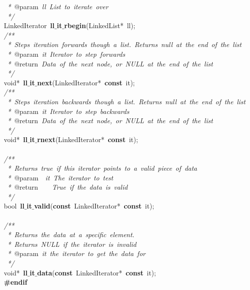 \documentclass{article}
\begin{document}
\mbox{}\textit{\ *\ }@param\textit{\ ll\ List\ to\ iterate\ over} \\
\mbox{}\textit{\ */} \\
\mbox{}LinkedIterator\ \textbf{ll$\_$it$\_$rbegin}(LinkedList*\ ll); \\
\mbox{}\textit{/**} \\
\mbox{}\textit{\ *\ Steps\ iteration\ forwards\ though\ a\ list.\ Returns\ null\ at\ the\ end\ of\ the\ list} \\
\mbox{}\textit{\ *\ }@param\textit{\ it\ Iterator\ to\ step\ forwards} \\
\mbox{}\textit{\ *\ }@return\textit{\ Data\ of\ the\ next\ node,\ or\ NULL\ at\ the\ end\ of\ the\ list} \\
\mbox{}\textit{\ */} \\
\mbox{}void*\ \textbf{ll$\_$it$\_$next}(LinkedIterator*\ \textbf{const}\ it); \\
\mbox{}\textit{/**} \\
\mbox{}\textit{\ *\ Steps\ iteration\ backwards\ though\ a\ list.\ Returns\ null\ at\ the\ end\ of\ the\ list} \\
\mbox{}\textit{\ *\ }@param\textit{\ it\ Iterator\ to\ step\ backwards} \\
\mbox{}\textit{\ *\ }@return\textit{\ Data\ of\ the\ next\ node,\ or\ NULL\ at\ the\ end\ of\ the\ list} \\
\mbox{}\textit{\ */} \\
\mbox{}void*\ \textbf{ll$\_$it$\_$rnext}(LinkedIterator*\ \textbf{const}\ it); \\
\mbox{} \\
\mbox{}\textit{/**} \\
\mbox{}\textit{\ *\ Returns\ true\ if\ this\ iterator\ points\ to\ a\ valid\ piece\ of\ data} \\
\mbox{}\textit{\ *\ }@param\textit{\ \ it\ The\ iterator\ to\ test} \\
\mbox{}\textit{\ *\ }@return\textit{\ \ \ \ True\ if\ the\ data\ is\ valid} \\
\mbox{}\textit{\ */} \\
\mbox{}bool\ \textbf{ll$\_$it$\_$valid}(\textbf{const}\ LinkedIterator*\ \textbf{const}\ it); \\
\mbox{} \\
\mbox{}\textit{/**} \\
\mbox{}\textit{\ *\ Returns\ the\ data\ at\ a\ specific\ element.} \\
\mbox{}\textit{\ *\ Returns\ NULL\ if\ the\ iterator\ is\ invalid} \\
\mbox{}\textit{\ *\ }@param\textit{\ it\ the\ iterator\ to\ get\ the\ data\ for} \\
\mbox{}\textit{\ */} \\
\mbox{}void*\ \textbf{ll$\_$it$\_$data}(\textbf{const}\ LinkedIterator*\ \textbf{const}\ it); \\
\mbox{}\textbf{\#endif} \\
\mbox{}
\end{document}
